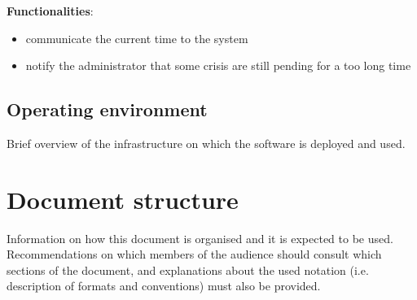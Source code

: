 \textbf{Functionalities}:

\begin{itemize}
  \item communicate the current time to the system
  \item notify the administrator that some crisis are still pending for a too
  long time
\end{itemize}

\subsection{Operating environment}
Brief overview of the infrastructure on which the software is deployed and used.

\section{Document structure}  
Information on how this document is organised and it is expected to be
used. Recommendations on which members of the audience
should consult which sections of the document, and explanations about the used
notation (i.e. description of formats and conventions) must also be provided.





